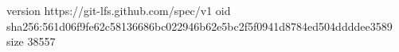 version https://git-lfs.github.com/spec/v1
oid sha256:561d06f9fe62c58136686bc022946b62e5bc2f5f0941d8784ed504ddddee3589
size 38557
